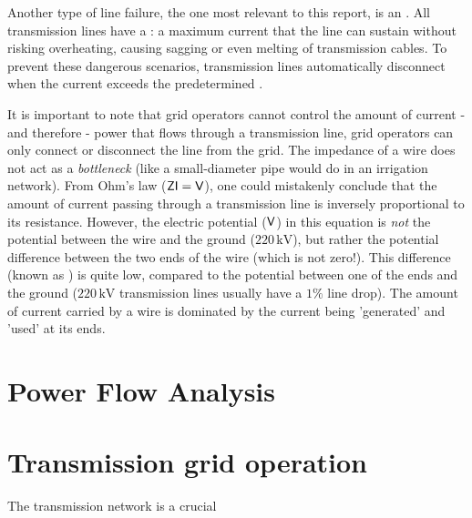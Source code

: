 \documentclass[main.tex]{subfiles}
\begin{document}
Another type of line failure, the one most relevant to this report, is an . All transmission lines have a : a maximum current that the line can sustain without risking overheating, causing sagging or even melting of transmission cables. To prevent these dangerous scenarios, transmission lines automatically disconnect when the current exceeds the predetermined . 

It is important to note that grid operators cannot control the amount of current - and therefore - power that flows through a transmission line, grid operators can only connect or disconnect the line from the grid. The impedance of a wire does not act as a \emph{bottleneck} (like a small-diameter pipe would do in an irrigation network). From Ohm's law ($\mathsf{ZI=V}$), one could mistakenly conclude that the amount of current passing through a transmission line is inversely proportional to its resistance. However, the electric potential ($\mathsf{V}$) in this equation is \emph{not} the potential between the wire and the ground (\eg $220\,\si{\kilo\volt}$), but rather the potential difference between the two ends of the wire (which is not zero!). This difference (known as ) is quite low, compared to the potential between one of the ends and the ground ($220\,\si{\kilo\volt}$ transmission lines usually have a $1\si{\percent}$ line drop). The amount of current carried by a wire is dominated by the current being 'generated' and 'used' at its ends.







\section{Power Flow Analysis}

\section{Transmission grid operation}
The transmission network is a crucial 
\end{document}
